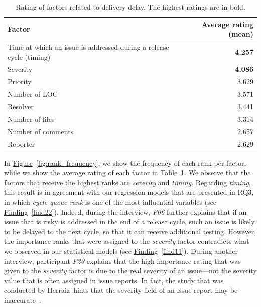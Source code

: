 \begin{sloppypar}
\begin{table}
	\footnotesize
	\centering
	\caption{Rating of factors related to delivery delay. The highest
		ratings are in bold.
		\label{tbl:factors}
	}
	\begin{tabular}{lr}
		\hline 
		\textbf{Factor} & \textbf{Average rating (mean)}\tabularnewline
		\hline 
		\hline 
		Time at which an issue is addressed during a release cycle (timing) & \textbf{4.257}\tabularnewline
		\hline 
		Severity & \textbf{4.086}\tabularnewline
		\hline 
		Priority & 3.629\tabularnewline
		\hline 
		Number of LOC & 3.571\tabularnewline
		\hline 
		Resolver & 3.441\tabularnewline
		\hline 
		Number of files & 3.314\tabularnewline
		\hline 
		Number of comments & 2.657\tabularnewline
		\hline 
		Reporter & 2.629\tabularnewline
		\hline 
	\end{tabular}
\end{table}

In \hyperref[fig:rank_frequency]{Figure}~\ref{fig:rank_frequency}, we show the
frequency of each rank per factor, while we show the average rating of each
factor in \hyperref[tbl:factors]{Table}~\ref{tbl:factors}. We observe that the
factors that receive the highest ranks are {\em severity} and {\em timing}.
Regarding {\em timing}, this result is in agreement with our regression models
that are presented in RQ3, in which {\em cycle queue rank} is one of the most
influential variables (see \hyperref[find22]{Finding}~\ref{find22}). Indeed,
during the interview, {\em F06} further explains that if an issue that is risky
is addressed in the end of a release cycle, such an issue is likely to be
delayed to the next cycle, so that it can receive additional testing. However,
the importance ranks that were assigned to the {\em severity} factor contradicts
what we observed in our statistical models (see
\hyperref[find11]{Finding}~\ref{find11}). During another interview, participant
{\em F23} explains that the high importance rating that was given to the {\em
severity} factor is due to the real severity of an issue---not the severity
value that is often assigned in issue reports. In fact, the study that was
conducted by Herraiz~\etal hints that the severity field of an issue report may
be inaccurate~\cite{Herraiz2008}.


\end{sloppypar}
